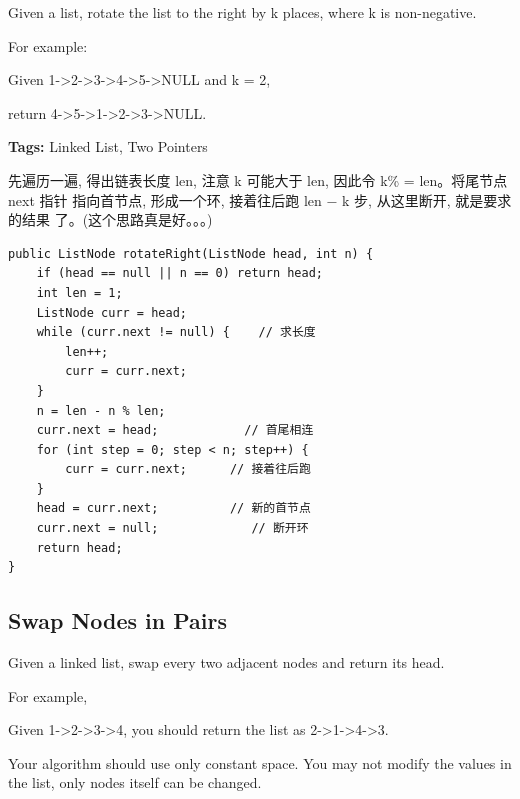 \documentclass[12pt]{book}
\begin{document}
Given a list, rotate the list to the right by k places, where k is non-negative.

For example:

Given 1->2->3->4->5->NULL and k = 2,

return 4->5->1->2->3->NULL.

\textbf{Tags:} Linked List, Two Pointers

先遍历一遍, 得出链表长度 len, 注意 k 可能大于 len, 因此令 k\% = len。将尾节点 next 指针
指向首节点, 形成一个环, 接着往后跑 len − k 步, 从这里断开, 就是要求的结果
了。(这个思路真是好。。。)

\lstset{language=java,label= ,caption= ,numbers=none}
\begin{lstlisting}
public ListNode rotateRight(ListNode head, int n) {
    if (head == null || n == 0) return head;
    int len = 1;
    ListNode curr = head;
    while (curr.next != null) {    // 求长度
        len++;
        curr = curr.next;
    }
    n = len - n % len;
    curr.next = head;            // 首尾相连
    for (int step = 0; step < n; step++) {
        curr = curr.next;      // 接着往后跑
    }
    head = curr.next;          // 新的首节点
    curr.next = null;             // 断开环
    return head;
}
\end{lstlisting}

\subsection{Swap Nodes in Pairs}
\label{sec-3-2-7}

Given a linked list, swap every two adjacent nodes and return its head.

For example,

Given 1->2->3->4, you should return the list as 2->1->4->3.

Your algorithm should use only constant space. You may not modify the values in the list, only nodes itself can be changed.
\end{document}
